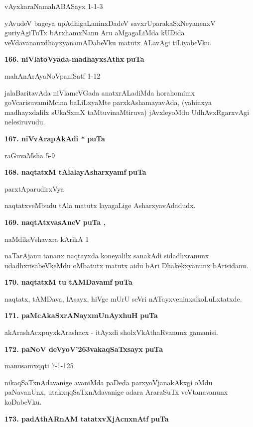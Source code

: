 \hfill{vAyxkaraNamahABASayx 1-1-3}

\smallskip
yAvudeV bageya upAdhigaLaninxDadeV savxrUparakaSxNeyanenxV guriyAgiTuTx bArxhamxNanu Aru aMga\-gaLiMda kUDida veVdavananxdhayxyanamADabeVku matutx ALavAgi tiLiyabeVku.

\medskip
\noindent
\textbf{166. niVlatoVyada-madhayxsAthx} \hfill{\bf puTa \pageref{166}}

\hfill{mahAnArAyaNoVpaniSatf 1-12}

\smallskip
jalaBaritavAda niVlameVGada anatxrALadiMda horahomimx goVcarisuva\break miMcina baLiLxyaMte parxkAsha\-mayavAda, (vahinxya madhayxdalilx sUkaSxmX taMtu\-vinaM\-tiruva) jAvxleyoMdu UdhAvxRgarxvAgi nelesiru\-vudu.

\medskip
\noindent
\textbf{167. niVvArapAkAdi *} \hfill{\bf puTa \pageref{57}}

\hfill{raGuvaMsha 5-9}

\eject

\noindent
\textbf{168. naqtatxM tAlalayAsharxyamf} \hfill{\bf puTa \pageref{249}}

\hfill{parxtAparudirxVya}

\smallskip
naqtatxveMbudu tAla matutx layagaLige AsharxyavAdadudx.

\medskip
\noindent
\textbf{169. naqtAtxvasAneV} \hfill{\bf puTa \pageref{40d}, \pageref{152}}

\hfill{naMdikeVshavxra kArikA 1}

\smallskip
naTarAjanu tananx naqtayxda koneyalilx sanakAdi sidadhxranunx udadhxrisabeVkeMdu oMbatutx matutx aidu bAri Dhakekxyanunx bArisidanu.

\medskip
\noindent
\textbf{170. naqtatxM tu tAMDavamf} \hfill{\bf puTa \pageref{241}}

\smallskip
naqtatx, tAMDava, lAsayx, hiVge mUrU seVri nATayxveninxsikoLuLxtatxde.

\medskip
\noindent
\textbf{171. paMcAkaSxrANayxmUnAyxhuH} \hfill{\bf puTa \pageref{161}}

\smallskip
akArashAcxpuyxkArashacx - itAyxdi sholxVkAthaRvanunx gamanisi.

\medskip
\noindent
\textbf{172. paNoV deVyoV\char'263vakaqSaTxsayx} \hfill{\bf puTa \pageref{223}}

\hfill{manusamxqqti 7-1-125}

\smallskip
nikaqSaTxnAdavanige avaniMda paDeda parxyoVjanakAkxgi oMdu paNavanUnx, utakxqqSaTxnAdavanige adara AraraSuTx veVtanavanunx koDabeVku.

\medskip
\noindent
\textbf{173. padAthARnAM tatatxvXjAcnxnAtf} \hfill{\bf puTa \pageref{41b}}

